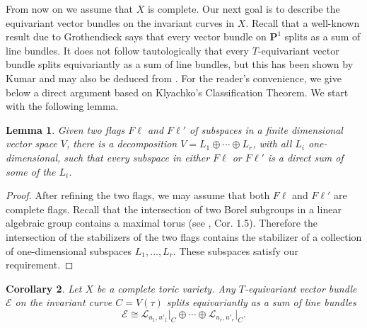 \documentclass[12pt]{amsart}
\newtheorem{lemma}{Lemma}[section]
\newtheorem{corollary}[lemma]{Corollary}
\theoremstyle{definition}
\theoremstyle{remark}
\begin{document}
\bigskip

From now on we assume that $X$ is complete. Our next goal is to
describe the equivariant vector bundles on the invariant curves in
$X$. Recall that a well-known result due to Grothendieck says that
every vector bundle on ${{\mathbf P}}^1$ splits as a sum of line bundles. It
does not follow tautologically that every $T$-equivariant vector
bundle splits equivariantly as a
 sum of line bundles, but this has been shown by Kumar \cite{Kumar} and may also be deduced from \cite[Example~2.3.3 and Section~6.3]{Klyachko}.
For the reader's convenience, we give below a direct argument based on
Klyachko's Classification Theorem.  We start with the following lemma.

\begin{lemma}\label{intersection_Borel}
Given two flags ${F\ell}$ and ${F\ell}'$ of subspaces in a finite
dimensional vector space $V$, there is a decomposition
$V=L_1\oplus\cdots\oplus L_r$, with all $L_i$ one-dimensional, such
that every subspace in either ${F\ell}$ or ${F\ell}'$ is a direct sum of
some of the $L_i$.
\end{lemma}

\begin{proof}
After refining the two flags, we may assume that both ${F\ell}$ and
${F\ell}'$ are complete flags. Recall that the intersection of two Borel
subgroups in a linear algebraic group contains a maximal torus (see
\cite{DM}, Cor. 1.5). Therefore the intersection of the stabilizers
of the two flags contains the stabilizer of a collection of
one-dimensional subspaces $L_1,\ldots,L_r$. These subspaces satisfy
our requirement.
\end{proof}

\begin{corollary}\label{P1}
Let $X$ be a complete toric variety. Any $T$-equivariant vector
bundle ${\mathcal{E}}$ on the invariant curve $C=V(\tau)$ splits equivariantly
as a sum of line bundles
\[
{\mathcal{E}} \cong {\mathcal{L}}_{u_1, u'_1}\vert_C \oplus \cdots \oplus {\mathcal{L}}_{u_r,
u'_r}\vert_C.
\]
\end{corollary}
\end{document}
